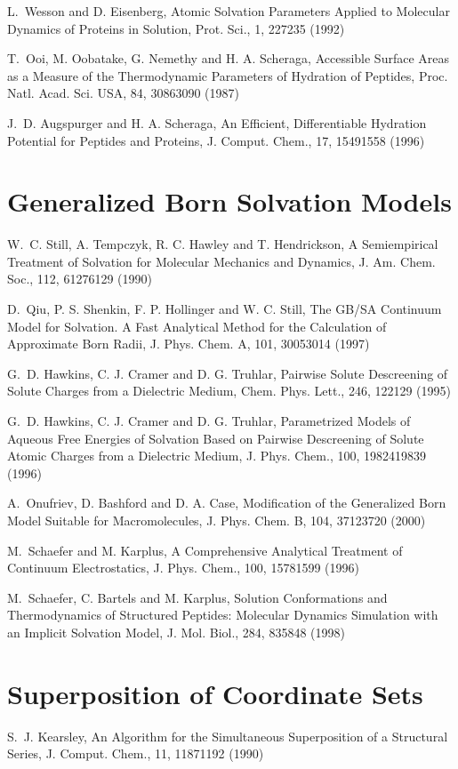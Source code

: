 \documentclass[letterpaper,11pt,english]{sphinxmanual}
\begin{document}
L. Wesson and D. Eisenberg, Atomic Solvation Parameters Applied to Molecular Dynamics of Proteins in Solution, Prot. Sci., 1, 227\sphinxhyphen{}235 (1992)

T. Ooi, M. Oobatake, G. Nemethy and H. A. Scheraga, Accessible Surface Areas as a Measure of the Thermodynamic Parameters of Hydration of Peptides, Proc. Natl. Acad. Sci. USA, 84, 3086\sphinxhyphen{}3090 (1987)

J. D. Augspurger and H. A. Scheraga, An Efficient, Differentiable Hydration Potential for Peptides and Proteins, J. Comput. Chem., 17, 1549\sphinxhyphen{}1558 (1996)


\section{Generalized Born Solvation Models}
\label{\detokenize{text/references:generalized-born-solvation-models}}
W. C. Still, A. Tempczyk, R. C. Hawley and T. Hendrickson, A Semiempirical Treatment of Solvation for Molecular Mechanics and Dynamics, J. Am. Chem. Soc., 112, 6127\sphinxhyphen{}6129 (1990)

D. Qiu, P. S. Shenkin, F. P. Hollinger and W. C. Still, The GB/SA Continuum Model for Solvation. A Fast Analytical Method for the Calculation of Approximate Born Radii, J. Phys. Chem. A, 101, 3005\sphinxhyphen{}3014 (1997)

G. D. Hawkins, C. J. Cramer and D. G. Truhlar, Pairwise Solute Descreening of Solute Charges from a Dielectric Medium, Chem. Phys. Lett., 246, 122\sphinxhyphen{}129 (1995)

G. D. Hawkins, C. J. Cramer and D. G. Truhlar, Parametrized Models of Aqueous Free Energies of Solvation Based on Pairwise Descreening of Solute Atomic Charges from a Dielectric Medium, J. Phys. Chem., 100, 19824\sphinxhyphen{}19839 (1996)

A. Onufriev, D. Bashford and D. A. Case, Modification of the Generalized Born Model Suitable for Macromolecules, J. Phys. Chem. B, 104, 3712\sphinxhyphen{}3720 (2000)

M. Schaefer and M. Karplus, A Comprehensive Analytical Treatment of Continuum Electrostatics, J. Phys. Chem., 100, 1578\sphinxhyphen{}1599 (1996)

M. Schaefer, C. Bartels and M. Karplus, Solution Conformations and Thermodynamics of Structured Peptides: Molecular Dynamics Simulation with an Implicit Solvation Model, J. Mol. Biol., 284, 835\sphinxhyphen{}848 (1998)


\section{Superposition of Coordinate Sets}
\label{\detokenize{text/references:superposition-of-coordinate-sets}}
S. J. Kearsley, An Algorithm for the Simultaneous Superposition of a Structural Series, J. Comput. Chem., 11, 1187\sphinxhyphen{}1192 (1990)
\end{document}

